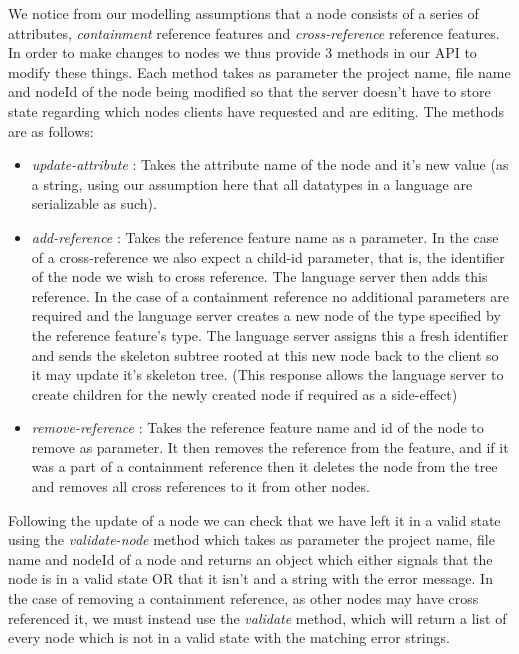 \documentclass{article}
\begin{document}
We notice from our modelling assumptions that a node consists of a series of attributes, \textit{containment} reference features and \textit{cross-reference} reference features. In order to make changes to nodes we thus provide 3 methods in our API to modify these things. Each method takes as parameter the project name, file name and nodeId of the node being modified so that the server doesn't have to store state regarding which nodes clients have requested and are editing. The methods are as follows: 
\begin{itemize}
\item \emph{update-attribute} : Takes the attribute name  of the node and it's new value (as a string, using our assumption here that all datatypes in a language are serializable as such). 
\item \emph{add-reference} : Takes the reference feature name as a parameter. In the case of a cross-reference we also expect a child-id parameter, that is, the identifier of the node we wish to cross reference. The language server then adds this reference. In the case of a containment reference no additional parameters are required and the language server creates a new node of the type specified by the reference feature's type. The language server assigns this a fresh identifier and sends the skeleton subtree rooted at this new node back to the client so it may update it's skeleton tree. (This response allows the language server to create children for the newly created node if required as a side-effect)
\item \emph{remove-reference} : Takes the reference feature name and id of the node to remove as parameter. It then removes the reference from the feature, and if it was a part of a containment reference then it deletes the node from the tree and removes all cross references to it from other nodes.
\end{itemize} 
Following the update of a node we can check that we have left it in a valid state using the \emph{validate-node} method which takes as parameter the project name, file name and nodeId of a node and returns an object which either signals that the node is in a valid state OR that it isn't and a string with the error message. In the case of removing a containment reference, as other nodes may have cross referenced it, we must instead use the \emph{validate} method, which will return a list of every node which is not in a valid state with the matching error strings.
\end{document}
